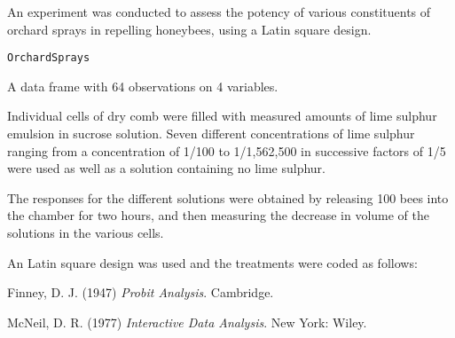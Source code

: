 %
\begin{Description}\relax
An experiment was conducted to assess the potency of various
constituents of orchard sprays in repelling honeybees, using a
Latin square design.
\end{Description}
%
\begin{Usage}
\begin{verbatim}
OrchardSprays
\end{verbatim}
\end{Usage}
%
\begin{Format}
A data frame with 64 observations on 4 variables.

\end{Format}
%
\begin{Details}\relax
Individual cells of dry comb were filled with measured amounts of lime
sulphur emulsion in sucrose solution.  Seven different concentrations
of lime sulphur ranging from a concentration of 1/100 to 1/1,562,500
in successive factors of 1/5 were used as well as a solution
containing no lime sulphur. 

The responses for the different solutions were obtained by releasing
100 bees into the chamber for two hours, and then measuring the
decrease in volume of the solutions in the various cells.

An  Latin square design was used and the
treatments were coded as follows:

\end{Details}
%
\begin{Source}\relax
Finney, D. J. (1947)
\emph{Probit Analysis}.
Cambridge.
\end{Source}
%
\begin{References}\relax
McNeil, D. R. (1977)
\emph{Interactive Data Analysis}.
New York: Wiley.
\end{References}
